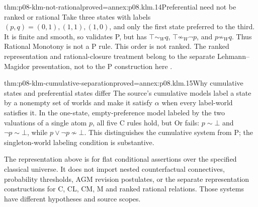 \begin{hbtheorem}{thm:p08-klm-not-rational}{proved=annex:p08.klm.14}{Preferential need not be ranked or rational}
Take three states with labels \((p,q)=(0,1),(1,1),(1,0)\), and
only the first state preferred to the third. It is finite and smooth,
so validates P, but has \(\top\sim_W q\),
\(\top\not\sim_W\neg p\), and \(p\not\sim_W q\).
Thus Rational Monotony is not a P rule. This order is not ranked.
The ranked representation and rational-closure treatment belong to the
separate Lehmann--Magidor presentation, not to the P construction here
\cite{LehmannMagidor1992}.
\end{hbtheorem}

\begin{hbtheorem}{thm:p08-klm-cumulative-separation}{proved=annex:p08.klm.15}{Why cumulative states and preferential states differ}
The source's cumulative models label a state by a nonempty set of worlds
and make it satisfy \(\alpha\) when every label-world satisfies it.
In the one-state, empty-preference model labeled by the two valuations
of a single atom \(p\), all five C rules hold, but Or fails:
\(p\sim\bot\) and \(\neg p\sim\bot\), while
\(p\vee\neg p\not\sim\bot\). This distinguishes the cumulative
system from P; the singleton-world labeling condition is substantive.
\end{hbtheorem}

The representation above is for flat conditional assertions over the
specified classical universe. It does not import nested counterfactual
connectives, probability thresholds, AGM revision postulates, or the
separate representation constructions for C, CL, CM, M and ranked rational
relations. Those systems have different hypotheses and source scopes.
